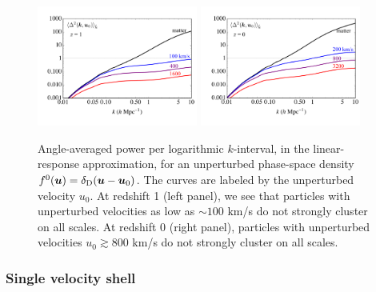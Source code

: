 \documentclass[useAMS, usenatbib]{mnras}
\newcommand{\bs}{\boldsymbol}
\newcommand{\spb}[1]{{\textcolor{green}{[{\bf SPB}: #1]}}}
\begin{document}
\begin{figure}
\includegraphics[width=0.47\textwidth]{nuplots/lin_resp_z1.pdf}
\includegraphics[width=0.47\textwidth]{nuplots/lin_resp_z0.pdf}
\caption{Angle-averaged power per logarithmic $k$-interval, in the linear-response approximation, for an unperturbed phase-space density $f^0(\bs{u}) = \delta_{\rm D}(\bs{u}- \bs{u}_0)$. The curves are labeled by the unperturbed velocity $u_0$. At redshift 1 (left panel), we see that particles with unperturbed velocities as low as $\sim 100$ km/s do not strongly cluster on all scales. At redshift 0 (right panel), particles with unperturbed velocities $u_0 \gtrsim 800$ km/s do not strongly cluster on all scales.}
\label{fig:halofitvshell}
\end{figure}


\subsubsection{Single velocity shell}

\end{document}

